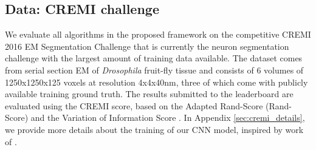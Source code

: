 \subsection{Data: CREMI challenge} \label{sec:cremi_challenge}
We evaluate all algorithms in the proposed framework on the competitive CREMI 2016 EM Segmentation Challenge \cite{cremiChallenge} that is currently the neuron segmentation challenge with the largest amount of training data available. The dataset comes from serial section EM of \emph{Drosophila} fruit-fly tissue and consists of 6 volumes of 1250x1250x125 voxels at resolution 4x4x40nm, three of which come with publicly available training ground truth. The results submitted to the leaderboard are evaluated using the CREMI score, based on the Adapted Rand-Score (Rand-Score) and the Variation of Information Score \cite{arganda2015crowdsourcing}. In Appendix \ref{sec:cremi_details}, we provide more details about the training of our CNN model, inspired by work of \cite{lee2017superhuman,funke2018large}.
